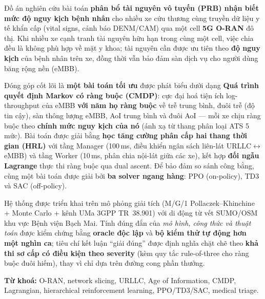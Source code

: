 Đồ án nghiên cứu bài toán \textbf{phân bổ tài nguyên vô tuyến (PRB) nhận biết mức độ nguy kịch bệnh nhân} cho nhiều xe cứu thương cùng truyền dữ liệu y tế khẩn cấp (vital signs, cảnh báo DENM/CAM) qua một cell \textbf{5G O-RAN} đô thị. Khi nhiều xe cạnh tranh tài nguyên hữu hạn trong cùng một cell, việc chia đều là không phù hợp về mặt y khoa; tài nguyên cần được ưu tiên theo \textbf{độ nguy kịch} của bệnh nhân trên xe, đồng thời vẫn bảo đảm sàn dịch vụ cho người dùng băng rộng nền (eMBB).

Đóng góp cốt lõi là \textbf{một bài toán tối ưu} được phát biểu dưới dạng \textbf{Quá trình quyết định Markov có ràng buộc (CMDP)}: cực đại hoá tiện ích log-throughput của eMBB \textbf{với năm họ ràng buộc} về trễ trung bình, đuôi trễ (độ tin cậy), sàn thông lượng eMBB, AoI trung bình và đuôi AoI --- mỗi xe chịu ràng buộc theo \textbf{chính mức nguy kịch của nó} (ánh xạ từ thang phân loại ATS 5 mức). Bài toán được giải bằng \textbf{học tăng cường phân cấp hai thang thời gian (HRL)} với tầng Manager (100\,ms, điều khiển ngân sách liên-lát URLLC$\leftrightarrow$eMBB) và tầng Worker (10\,ms, phân chia nội-lát giữa các xe), kết hợp \textbf{đối ngẫu Lagrange} thực thi ràng buộc qua dual ascent. Để bảo đảm so sánh công bằng, cùng một bài toán được giải bởi \textbf{ba solver ngang hàng}: PPO (on-policy), TD3 và SAC (off-policy).

Hệ thống được triển khai trên mô phỏng giải tích (M/G/1 Pollaczek--Khinchine + Monte Carlo + kênh UMa 3GPP TR~38.901) với di động từ vết SUMO/OSM khu vực Bệnh viện Bạch Mai. Tính đúng đắn của \emph{mô hình, công thức và thuật toán} được kiểm chứng bằng \textbf{oracle độc lập} và \textbf{bộ kiểm thử tự động hơn một nghìn ca}; tiêu chí kết luận ``giải đúng'' được định nghĩa chặt chẽ theo \textbf{khả thi sơ cấp có điều kiện theo severity} (kèm quy tắc rule-of-three cho ràng buộc đuôi hiếm), thay vì chỉ dựa trên đường cong phần thưởng.

\medskip\noindent
\textbf{Từ khoá:} O-RAN, network slicing, URLLC, Age of Information, CMDP, Lagrangian, hierarchical reinforcement learning, PPO/TD3/SAC, medical triage.
